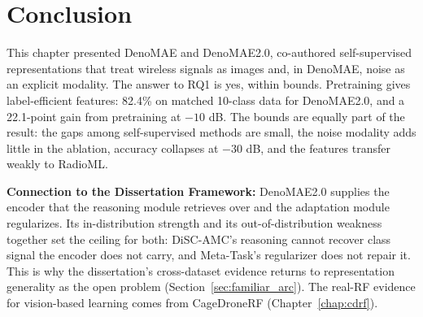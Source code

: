 \section{Conclusion}

This chapter presented DenoMAE and DenoMAE2.0, co-authored self-supervised representations that treat wireless signals as images and, in DenoMAE, noise as an explicit modality. The answer to RQ1 is yes, within bounds. Pretraining gives label-efficient features: 82.4\% on matched 10-class data for DenoMAE2.0, and a 22.1-point gain from pretraining at $-10$ dB. The bounds are equally part of the result: the gaps among self-supervised methods are small, the noise modality adds little in the ablation, accuracy collapses at $-30$ dB, and the features transfer weakly to RadioML.

\textbf{Connection to the Dissertation Framework:} DenoMAE2.0 supplies the encoder that the reasoning module retrieves over and the adaptation module regularizes. Its in-distribution strength and its out-of-distribution weakness together set the ceiling for both: DiSC-AMC's reasoning cannot recover class signal the encoder does not carry, and Meta-Task's regularizer does not repair it. This is why the dissertation's cross-dataset evidence returns to representation generality as the open problem (Section~\ref{sec:familiar_arc}). The real-RF evidence for vision-based learning comes from CageDroneRF (Chapter~\ref{chap:cdrf}).
